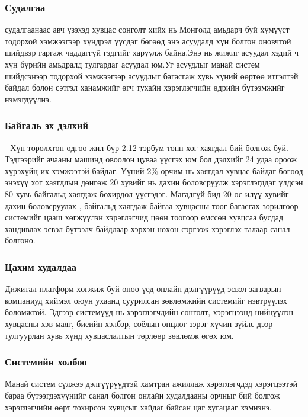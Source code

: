 \subsubsection*{Судалгаа}
 судалгаанаас авч үзэхэд хувцас сонголт хийх нь Монголд амьдарч буй хүмүүст тодорхой хэмжээгээр хүндрэл үүсдэг бөгөөд энэ асуудалд хүн болгон оновчтой шийдвэр гаргаж чаддаггүй гэдгийг харуулж байна.Энэ нь жижиг асуудал хэдий ч хүн бүрийн амьдралд тулгардаг асуудал юм.Уг асуудлыг манай систем шийдсэнээр тодорхой хэмжээгээр асуудлыг багасгаж хувь хүний өөртөө итгэлтэй байдал болон сэтгэл ханамжийг өгч тухайн хэрэглэгчийн өдрийн бүтээмжийг нэмэгдүүлнэ.

\subsubsection*{Байгаль эх дэлхий} - Хүн төрөлхтөн өдгөө жил бүр 2.12 тэрбум тонн хог хаягдал бий болгож буй. Тэдгээрийг ачааны машинд овоолон цуваа үүсгэх юм бол дэлхийг 24 удаа ороож хүрэхүйц их хэмжээтэй байдаг. Үүний 2\% орчим нь хаягдал хувцас байдаг бөгөөд энэхүү хог хаягдлын дөнгөж 20 хувийг нь дахин боловсруулж хэрэглэгддэг үлдсэн 80 хувь байгальд хаягдаж бохирдол үүсгэдэг. Магадгүй бид 20-ос илүү хувийг дахин боловсруулах , байгальд хаягдаж байгаа хувцасны тоог багасгах зорилгоор системийг цааш хөгжүүлэн хэрэглэгчид  цөөн тоогоор өмссөн хувцсаа бусдад хандивлах эсвэл бүтээлч байдлаар хэрхэн нөхөн сэргээж хэрэглэх талаар санал болгоно. 
\subsubsection*{Цахим худалдаа}Дижитал платформ хөгжиж буй өнөө үед онлайн дэлгүүрүүд эсвэл загварын компаниуд хиймэл оюун ухаанд суурилсан зөвлөмжийн системийг нэвтрүүлэх боломжтой. Эдгээр системүүд нь хэрэглэгчдийн сонголт, хэрэгцээнд нийцүүлэн хувцасны хэв маяг, биеийн хэлбэр, соёлын онцлог зэрэг хүчин зүйлс дээр тулгуурлан хувь хүнд хувцаслалтын төрлөөр зөвлөмж өгөх юм.

\subsubsection*{Системийн холбоо}Манай систем сүлжээ дэлгүүрүүдтэй хамтран ажиллаж хэрэглэгчдэд хэрэгцээтэй бараа бүтээгдэхүүнийг санал болгон онлайн худалдааны орчныг бий болгож хэрэглэгчийн өөрт тохирсон хувцсыг хайдаг байсан цаг хугацааг хэмнэнэ.

